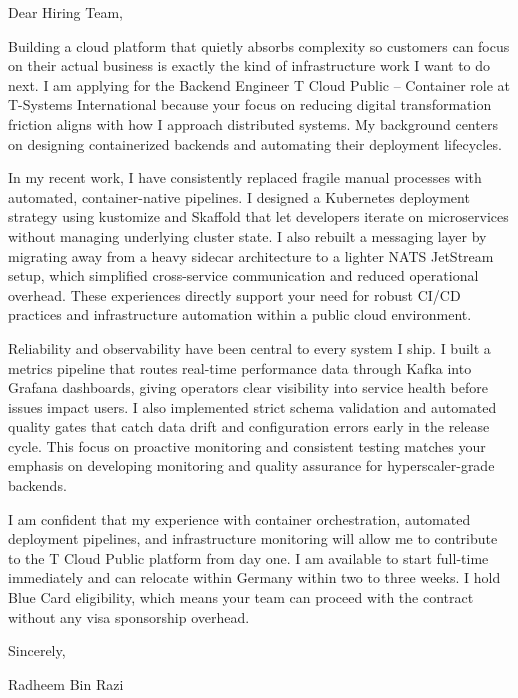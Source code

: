 \documentclass[11pt,a4paper]{coverletter}
\begin{document}

\opening{Dear Hiring Team,}

Building a cloud platform that quietly absorbs complexity so customers can focus on their actual business is exactly the kind of infrastructure work I want to do next. I am applying for the Backend Engineer T Cloud Public – Container role at T-Systems International because your focus on reducing digital transformation friction aligns with how I approach distributed systems. My background centers on designing containerized backends and automating their deployment lifecycles.

In my recent work, I have consistently replaced fragile manual processes with automated, container-native pipelines. I designed a Kubernetes deployment strategy using kustomize and Skaffold that let developers iterate on microservices without managing underlying cluster state. I also rebuilt a messaging layer by migrating away from a heavy sidecar architecture to a lighter NATS JetStream setup, which simplified cross-service communication and reduced operational overhead. These experiences directly support your need for robust CI/CD practices and infrastructure automation within a public cloud environment.

Reliability and observability have been central to every system I ship. I built a metrics pipeline that routes real-time performance data through Kafka into Grafana dashboards, giving operators clear visibility into service health before issues impact users. I also implemented strict schema validation and automated quality gates that catch data drift and configuration errors early in the release cycle. This focus on proactive monitoring and consistent testing matches your emphasis on developing monitoring and quality assurance for hyperscaler-grade backends.

I am confident that my experience with container orchestration, automated deployment pipelines, and infrastructure monitoring will allow me to contribute to the T Cloud Public platform from day one. I am available to start full-time immediately and can relocate within Germany within two to three weeks. I hold Blue Card eligibility, which means your team can proceed with the contract without any visa sponsorship overhead.

\closing{Sincerely,}{Radheem Bin Razi}

\clearpage
{}

\end{document}
